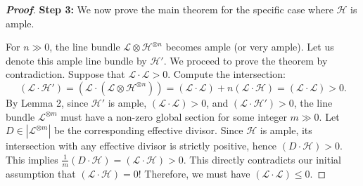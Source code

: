 \begin{proof}[\textbf{Proof}]
\textbf{Step 3:}
We now prove the main theorem for the specific case where $\mathcal{H}$ is ample. 

For $n \gg 0$, the line bundle $\mathcal{L} \otimes \mathcal{H}^{\otimes n}$ becomes ample (or very ample). Let us denote this ample line bundle by $\mathcal{H}'$. We proceed to prove the theorem by contradiction. Suppose that $\mathcal{L} \cdot \mathcal{L} > 0$. 
Compute the intersection:
\[
(\mathcal{L} \cdot \mathcal{H}') = (\mathcal{L} \cdot (\mathcal{L} \otimes \mathcal{H}^{\otimes n})) = (\mathcal{L} \cdot \mathcal{L}) + n(\mathcal{L} \cdot \mathcal{H}) = (\mathcal{L} \cdot \mathcal{L}) > 0.
\]
By Lemma 2, since $\mathcal{H}'$ is ample, $(\mathcal{L} \cdot \mathcal{L}) > 0$, and $(\mathcal{L} \cdot \mathcal{H}') > 0$, the line bundle $\mathcal{L}^{\otimes m}$ must have a non-zero global section for some integer $m \gg 0$. Let $D \in |\mathcal{L}^{\otimes m}|$ be the corresponding effective divisor. Since $\mathcal{H}$ is ample, its intersection with any effective divisor is strictly positive, hence $(D \cdot \mathcal{H}) > 0$. This implies $\frac{1}{m}(D \cdot \mathcal{H}) = (\mathcal{L} \cdot \mathcal{H}) > 0$.
This directly contradicts our initial assumption that $(\mathcal{L} \cdot \mathcal{H}) = 0$! Therefore, we must have $(\mathcal{L} \cdot \mathcal{L}) \leq 0$.



\end{proof}
